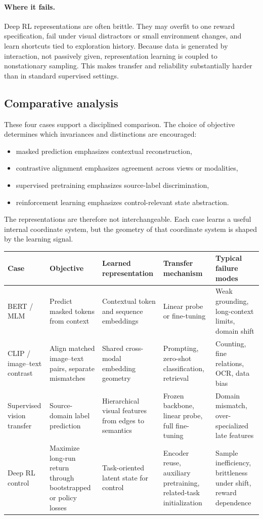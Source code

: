 \paragraph{Where it fails.}
Deep RL representations are often brittle.
They may overfit to one reward specification, fail under visual distractors or small environment changes, and learn shortcuts tied to exploration history.
Because data is generated by interaction, not passively given, representation learning is coupled to nonstationary sampling.
This makes transfer and reliability substantially harder than in standard supervised settings.

\subsection*{Comparative analysis}

These four cases support a disciplined comparison.
The choice of objective determines which invariances and distinctions are encouraged:
\begin{itemize}
    \item masked prediction emphasizes contextual reconstruction,
    \item contrastive alignment emphasizes agreement across views or modalities,
    \item supervised pretraining emphasizes source-label discrimination,
    \item reinforcement learning emphasizes control-relevant state abstraction.
\end{itemize}
The representations are therefore not interchangeable.
Each case learns a useful internal coordinate system, but the geometry of that coordinate system is shaped by the learning signal.

\begin{center}
\small
\begin{tabular}{|p{2.4cm}|p{2.8cm}|p{2.7cm}|p{2.8cm}|p{2.4cm}|}
\hline
\textbf{Case} & \textbf{Objective} & \textbf{Learned representation} & \textbf{Transfer mechanism} & \textbf{Typical failure modes} \\
\hline
BERT / MLM & Predict masked tokens from context & Contextual token and sequence embeddings & Linear probe or fine-tuning & Weak grounding, long-context limits, domain shift \\
\hline
CLIP / image--text contrast & Align matched image--text pairs, separate mismatches & Shared cross-modal embedding geometry & Prompting, zero-shot classification, retrieval & Counting, fine relations, OCR, data bias \\
\hline
Supervised vision transfer & Source-domain label prediction & Hierarchical visual features from edges to semantics & Frozen backbone, linear probe, full fine-tuning & Domain mismatch, over-specialized late features \\
\hline
Deep RL control & Maximize long-run return through bootstrapped or policy losses & Task-oriented latent state for control & Encoder reuse, auxiliary pretraining, related-task initialization & Sample inefficiency, brittleness under shift, reward dependence \\
\hline
\end{tabular}
\end{center}

